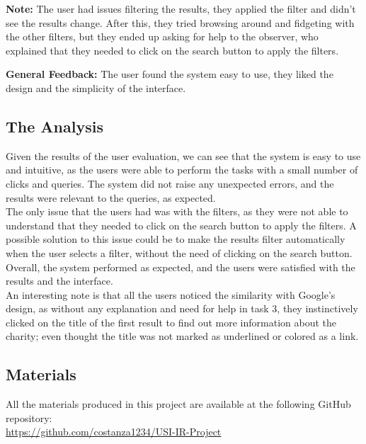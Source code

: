 \documentclass[unicode,9pt,a4paper,oneside,numbers=endperiod,openany]{scrartcl}
\begin{document}
\vspace{0.2cm}

\textbf{Note:} The user had issues filtering the results, they applied the filter and didn't see the results change.
After this, they tried browsing around and fidgeting with the other filters, but they ended up asking for help to the observer,
who explained that they needed to click on the search button to apply the filters.

\textbf{General Feedback:} The user found the system easy to use, they liked the design and the simplicity of the interface.

\subsection{The Analysis}
Given the results of the user evaluation, we can see that the system is easy to use and intuitive, as the users were able to perform the tasks with a small number of clicks and queries.
The system did not raise any unexpected errors, and the results were relevant to the queries, as expected.
\\
The only issue that the users had was with the filters, as they were not able to understand that they needed to click on the search button to apply the filters.
A possible solution to this issue could be to make the results filter automatically when the user selects a filter, without the need of clicking on the search button.
\\
Overall, the system performed as expected, and the users were satisfied with the results and the interface.
\\
An interesting note is that all the users noticed the similarity with Google's design,
as without any explanation and need for help in task 3, they instinctively clicked on the title of the first result to find out more information about the charity;
even thought the title was not marked as underlined or colored as a link.

\subsection{Materials}

All the materials produced in this project are available at the following GitHub repository:
\\
\url{https://github.com/costanza1234/USI-IR-Project}
\end{document}
